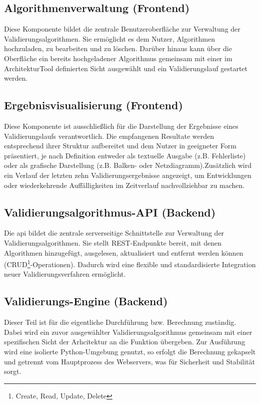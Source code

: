 \subsection*{Algorithmenverwaltung (Frontend)}

Diese Komponente bildet die zentrale Benutzeroberfläche zur Verwaltung der Validierungsalgorithmen. Sie ermöglicht es dem Nutzer, Algorithmen hochzuladen, zu bearbeiten und zu löschen. Darüber hinaus kann über die Oberfläche ein bereits hochgeladener Algorithmus gemeinsam mit einer im ArchitekturTool definierten Sicht ausgewählt und ein Validierungslauf gestartet werden.

\subsection*{Ergebnisvisualisierung (Frontend)}

Diese Komponente ist ausschließlich für die Darstellung der Ergebnisse eines Validierungslaufs verantwortlich. Die empfangenen Resultate werden entsprechend ihrer Struktur aufbereitet und dem Nutzer in geeigneter Form präsentiert, je nach Definition entweder als textuelle Ausgabe (z.B. Fehlerliste) oder als grafische Darstellung (z.B. Balken- oder Netzdiagramm).Zusätzlich wird ein Verlauf der letzten zehn Validierungsergebnisse angezeigt, um Entwicklungen oder wiederkehrende Auffälligkeiten im Zeitverlauf nachvollziehbar zu machen.

\subsection*{Validierungsalgorithmus-API (Backend)}

Die \gls{api} bildet die zentrale serverseitige Schnittstelle zur Verwaltung der Validierungsalgorithmen. Sie stellt REST-Endpunkte bereit, mit denen Algorithmen hinzugefügt, ausgelesen, aktualisiert und entfernt werden können (CRUD\footnote{Create, Read, Update, Delete}-Operationen). Dadurch wird eine flexible und standardisierte Integration neuer Validierungsverfahren ermöglicht.

\subsection*{Validierungs-Engine (Backend)}

Dieser Teil ist für die eigentliche Durchführung bzw. Berechnung zuständig. Dabei wird ein zuvor ausgewählter Validierungsalgorithmus gemeinsam mit einer spezifischen Sicht der Arhcitektur an die Funktion übergeben. Zur Ausführung wird eine isolierte Python-Umgebung genutzt, so erfolgt die Berechnung gekapselt und getrennt vom Hauptprozess des Webservers, was für Sicherheit und Stabilität sorgt.\\


